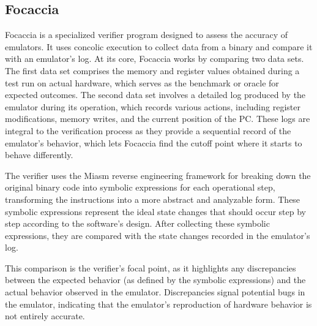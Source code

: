 \subsection{Focaccia}
Focaccia is a specialized verifier program designed to assess the accuracy of emulators.
It uses concolic execution to collect data from a binary and compare it with an emulator's log.
At its core, Focaccia works by comparing two data sets.
The first data set comprises the memory and register values obtained during a test run on actual hardware, which serves as the benchmark or oracle for expected outcomes. 
The second data set involves a detailed log produced by the emulator during its operation, which records various actions, including register modifications, memory writes, and the current position of the \ac{PC}.
These logs are integral to the verification process as they provide a sequential record of the emulator's behavior, which lets Focaccia find the cutoff point where it starts to behave differently.

The verifier uses the Miasm \cite{desclaux2012miasm} reverse engineering framework for breaking down the original binary code into symbolic expressions for each operational step, transforming the instructions into a more abstract and analyzable form.
These symbolic expressions represent the ideal state changes that should occur step by step according to the software's design.
After collecting these symbolic expressions, they are compared with the state changes recorded in the emulator's log.

This comparison is the verifier's focal point, as it highlights any discrepancies between the expected behavior (as defined by the symbolic expressions) and the actual behavior observed in the emulator.
Discrepancies signal potential bugs in the emulator, indicating that the emulator's reproduction of hardware behavior is not entirely accurate.
